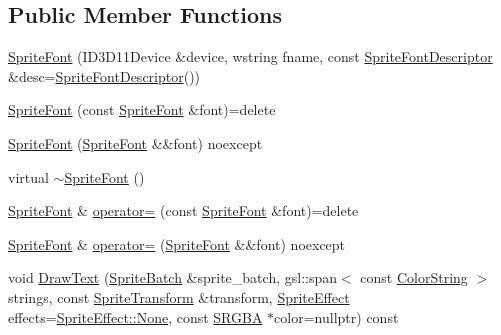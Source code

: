 \subsection*{Public Member Functions}
\begin{DoxyCompactItemize}
\item 
\hyperlink{classmage_1_1rendering_1_1_sprite_font_a6080794a32e8e4fa4b2be7392a4e9466}{Sprite\+Font} (I\+D3\+D11\+Device \&device, wstring fname, const \hyperlink{classmage_1_1rendering_1_1_sprite_font_descriptor}{Sprite\+Font\+Descriptor} \&desc=\hyperlink{classmage_1_1rendering_1_1_sprite_font_descriptor}{Sprite\+Font\+Descriptor}())
\item 
\hyperlink{classmage_1_1rendering_1_1_sprite_font_a80cfc8c939ee3709f7a6f9441a5bd688}{Sprite\+Font} (const \hyperlink{classmage_1_1rendering_1_1_sprite_font}{Sprite\+Font} \&font)=delete
\item 
\hyperlink{classmage_1_1rendering_1_1_sprite_font_a9a2014908c6c63aa9d9ad223383bd03a}{Sprite\+Font} (\hyperlink{classmage_1_1rendering_1_1_sprite_font}{Sprite\+Font} \&\&font) noexcept
\item 
virtual \hyperlink{classmage_1_1rendering_1_1_sprite_font_a51ec0418e1456d7634c6540ccc801644}{$\sim$\+Sprite\+Font} ()
\item 
\hyperlink{classmage_1_1rendering_1_1_sprite_font}{Sprite\+Font} \& \hyperlink{classmage_1_1rendering_1_1_sprite_font_a3d0054493b983437a392c807523d744e}{operator=} (const \hyperlink{classmage_1_1rendering_1_1_sprite_font}{Sprite\+Font} \&font)=delete
\item 
\hyperlink{classmage_1_1rendering_1_1_sprite_font}{Sprite\+Font} \& \hyperlink{classmage_1_1rendering_1_1_sprite_font_a95317d173b64565c6cba865ca524fe2f}{operator=} (\hyperlink{classmage_1_1rendering_1_1_sprite_font}{Sprite\+Font} \&\&font) noexcept
\item 
void \hyperlink{classmage_1_1rendering_1_1_sprite_font_a7fcea81ff14bc87c61688dda7ca56e85}{Draw\+Text} (\hyperlink{classmage_1_1rendering_1_1_sprite_batch}{Sprite\+Batch} \&sprite\+\_\+batch, gsl\+::span$<$ const \hyperlink{classmage_1_1rendering_1_1_color_string}{Color\+String} $>$ strings, const \hyperlink{classmage_1_1_sprite_transform}{Sprite\+Transform} \&transform, \hyperlink{namespacemage_1_1rendering_a4dbc3536c87b906f1d41d863ec458e78}{Sprite\+Effect} effects=\hyperlink{namespacemage_1_1rendering_a4dbc3536c87b906f1d41d863ec458e78a6adf97f83acf6453d4a6a4b1070f3754}{Sprite\+Effect\+::\+None}, const \hyperlink{structmage_1_1_s_r_g_b_a}{S\+R\+G\+BA} $\ast$color=nullptr) const

\end{DoxyCompactItemize}

